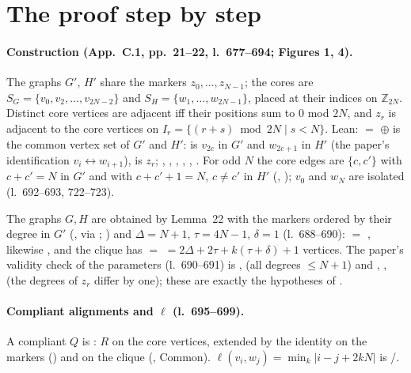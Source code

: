 \section{The proof step by step}

\paragraph{Construction (App.~C.1, pp.~21--22, l.~677--694; Figures 1, 4).} The graphs $G'$, $H'$ share the
markers $z_0,\dots,z_{N-1}$; the cores are $S_G=\{v_0,v_2,\dots,v_{2N-2}\}$ and $S_H=\{w_1,\dots,w_{2N-1}\}$,
placed at their indices on $\mathbb Z_{2N}$. Distinct core vertices are adjacent iff their positions sum to $0$
mod $2N$, and $z_r$ is adjacent to the core vertices on $I_r=\{(r+s)\bmod 2N\mid s<N\}$. Lean: 
$=$  $\oplus$  is the common vertex set of $G'$ and $H'$:  is $v_{2c}$ in
$G'$ and $w_{2c+1}$ in $H'$ (the paper's identification $v_i\leftrightarrow w_{i+1}$),  is $z_r$;
, , , , , . For odd $N$ the core edges
are $\{c,c'\}$ with $c+c'=N$ in $G'$ and with $c+c'+1=N$, $c\ne c'$ in $H'$ (,
); $v_0$ and $w_N$ are isolated (l.~692--693, 722--723).

The graphs $G,H$ are obtained by Lemma~22 with the markers ordered by their degree in $G'$ (,
via ; ) and $\Delta=N+1$, $\tau=4N-1$, $\delta=1$ (l.~688--690):
 $=$ , likewise , and the
clique has  $=$  $=2\Delta+2\tau+k(\tau+\delta)+1$ vertices.
The paper's validity check of the parameters (l.~690--691) is , 
(all degrees $\le N+1$) and , ,  (the degrees of $z_r$
differ by one); these are exactly the hypotheses of .

\paragraph{Compliant alignments and $\ell$ (l.~695--699).} A compliant $Q$ is :
$R$ on the core vertices, extended by the identity on the markers () and on the clique
(, Common). $\ell(v_i,w_j)=\min_k|i-j+2kN|$ is /.

